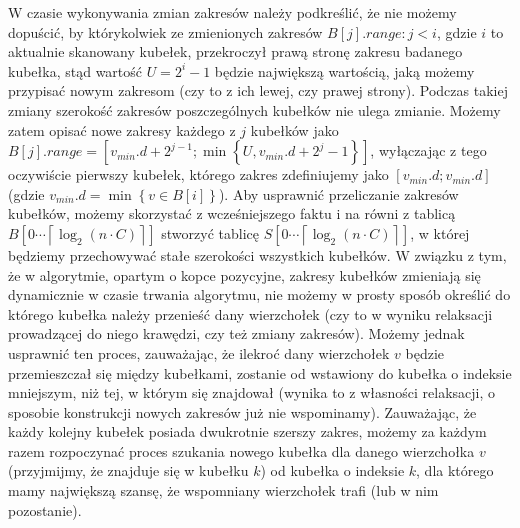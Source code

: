 W czasie wykonywania zmian zakresów należy podkreślić, że nie możemy dopuścić, by którykolwiek ze zmienionych zakresów $B \left[ j \right].range : j < i$, gdzie $i$ to aktualnie skanowany kubełek, przekroczył prawą stronę zakresu badanego kubełka, stąd wartość $U = 2^{i} - 1$ będzie największą wartością, jaką możemy przypisać nowym zakresom (czy to z ich lewej, czy prawej strony). Podczas takiej zmiany szerokość zakresów poszczególnych kubełków nie ulega zmianie. Możemy zatem opisać nowe zakresy każdego z $j$ kubełków jako $B \left[ j \right].range = \left[ v_{min}.d + 2 ^{j-1} ; \min \left\{ U, v_{min}.d + 2^{j} - 1 \right\} \right] \label{eq:radixHeapNewBucketRange}$, wyłączając z tego oczywiście pierwszy kubełek, którego zakres zdefiniujemy jako $\left[ v_{min}.d ; v_{min}.d \right]$ (gdzie $v_{min}.d = \min \left\{ v \in B \left[ i \right] \right\}$). Aby usprawnić przeliczanie zakresów kubełków, możemy skorzystać z wcześniejszego faktu i na równi z tablicą $B \left[ 0 \cdots \left \lceil \log_{2} \left( n \cdot C \right) \right \rceil \right]$ stworzyć tablicę $S \left[ 0 \cdots \left \lceil \log_{2} \left( n \cdot C \right) \right \rceil \right]$, w której będziemy przechowywać stałe szerokości wszystkich kubełków. W związku z tym, że w algorytmie, opartym o kopce pozycyjne, zakresy kubełków zmieniają się dynamicznie w czasie trwania algorytmu, nie możemy w prosty sposób określić do którego kubełka należy przenieść dany wierzchołek (czy to w wyniku relaksacji prowadzącej do niego krawędzi, czy też zmiany zakresów). Możemy jednak usprawnić ten proces, zauważając, że ilekroć dany wierzchołek $v$ będzie przemieszczał się między kubełkami, zostanie od wstawiony do kubełka o indeksie mniejszym, niż tej, w którym się znajdował (wynika to z własności relaksacji, o sposobie konstrukcji nowych zakresów już nie wspominamy). Zauważając, że każdy kolejny kubełek posiada dwukrotnie szerszy zakres, możemy za każdym razem rozpoczynać proces szukania nowego kubełka dla danego wierzchołka $v$ (przyjmijmy, że znajduje się w kubełku $k$) od kubełka o indeksie $k$, dla którego mamy największą szansę, że wspomniany wierzchołek trafi (lub w nim pozostanie).

